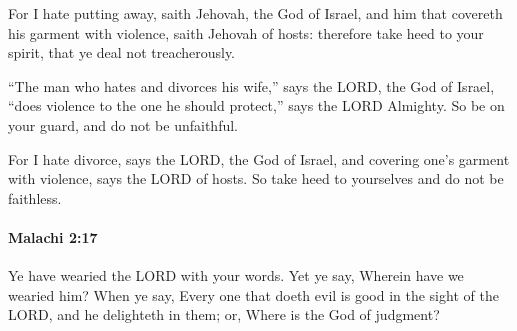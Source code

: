 			\begin{versebox}
					\item[BHS] 
					\item[LXX] 
					\item[ASV] For I hate putting away, saith Jehovah, the God of Israel, and him that covereth his garment with violence, saith Jehovah of hosts: therefore take heed to your spirit, that ye deal not treacherously.
					\item[NIV] “The man who hates and divorces his wife,” says the LORD, the God of Israel, “does violence to the one he should protect,” says the LORD Almighty. So be on your guard, and do not be unfaithful.
					\item[NRSV] For I hate divorce, says the LORD, the God of Israel, and covering one’s garment with violence, says the LORD of hosts. So take heed to yourselves and do not be faithless.
			\end{versebox}

		\paragraph{Malachi 2:17} %
			\label{MALACHI-2-17}

			Ye have wearied the LORD with your words. Yet ye say, Wherein have we wearied him? When ye say, Every one that doeth evil is good in the sight of the LORD, and he delighteth in them; or, Where is the God of judgment?

